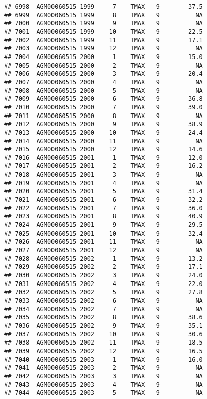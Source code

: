 \documentclass{article}\usepackage[]{graphicx}\usepackage[]{color}
\makeatletter
\newenvironment{kframe}{%
 \def\at@end@of@kframe{}%
 \ifinner\ifhmode%
  \def\at@end@of@kframe{\end{minipage}}%
  \begin{minipage}{\columnwidth}%
 \fi\fi%
 \def\FrameCommand##1{\hskip\@totalleftmargin \hskip-\fboxsep
 \colorbox{shadecolor}{##1}\hskip-\fboxsep
     \hskip-\linewidth \hskip-\@totalleftmargin \hskip\columnwidth}%
 \MakeFramed {\advance\hsize-\width
   \@totalleftmargin\z@ \linewidth\hsize
   \@setminipage}}%
 {\par\unskip\endMakeFramed%
 \at@end@of@kframe}
\newenvironment{knitrout}{}{} %
\makeatother
\begin{document}
\begin{knitrout}
\begin{kframe}
\begin{verbatim}
## 6998  AGM00060515 1999     7    TMAX   9        37.5
## 6999  AGM00060515 1999     8    TMAX   9          NA
## 7000  AGM00060515 1999     9    TMAX   9          NA
## 7001  AGM00060515 1999    10    TMAX   9        22.5
## 7002  AGM00060515 1999    11    TMAX   9        17.1
## 7003  AGM00060515 1999    12    TMAX   9          NA
## 7004  AGM00060515 2000     1    TMAX   9        15.0
## 7005  AGM00060515 2000     2    TMAX   9          NA
## 7006  AGM00060515 2000     3    TMAX   9        20.4
## 7007  AGM00060515 2000     4    TMAX   9          NA
## 7008  AGM00060515 2000     5    TMAX   9          NA
## 7009  AGM00060515 2000     6    TMAX   9        36.8
## 7010  AGM00060515 2000     7    TMAX   9        39.0
## 7011  AGM00060515 2000     8    TMAX   9          NA
## 7012  AGM00060515 2000     9    TMAX   9        38.9
## 7013  AGM00060515 2000    10    TMAX   9        24.4
## 7014  AGM00060515 2000    11    TMAX   9          NA
## 7015  AGM00060515 2000    12    TMAX   9        14.6
## 7016  AGM00060515 2001     1    TMAX   9        12.0
## 7017  AGM00060515 2001     2    TMAX   9        16.2
## 7018  AGM00060515 2001     3    TMAX   9          NA
## 7019  AGM00060515 2001     4    TMAX   9          NA
## 7020  AGM00060515 2001     5    TMAX   9        31.4
## 7021  AGM00060515 2001     6    TMAX   9        32.2
## 7022  AGM00060515 2001     7    TMAX   9        36.0
## 7023  AGM00060515 2001     8    TMAX   9        40.9
## 7024  AGM00060515 2001     9    TMAX   9        29.5
## 7025  AGM00060515 2001    10    TMAX   9        32.4
## 7026  AGM00060515 2001    11    TMAX   9          NA
## 7027  AGM00060515 2001    12    TMAX   9          NA
## 7028  AGM00060515 2002     1    TMAX   9        13.2
## 7029  AGM00060515 2002     2    TMAX   9        17.1
## 7030  AGM00060515 2002     3    TMAX   9        24.0
## 7031  AGM00060515 2002     4    TMAX   9        22.0
## 7032  AGM00060515 2002     5    TMAX   9        27.8
## 7033  AGM00060515 2002     6    TMAX   9          NA
## 7034  AGM00060515 2002     7    TMAX   9          NA
## 7035  AGM00060515 2002     8    TMAX   9        38.6
## 7036  AGM00060515 2002     9    TMAX   9        35.1
## 7037  AGM00060515 2002    10    TMAX   9        30.6
## 7038  AGM00060515 2002    11    TMAX   9        18.5
## 7039  AGM00060515 2002    12    TMAX   9        16.5
## 7040  AGM00060515 2003     1    TMAX   9        16.0
## 7041  AGM00060515 2003     2    TMAX   9          NA
## 7042  AGM00060515 2003     3    TMAX   9          NA
## 7043  AGM00060515 2003     4    TMAX   9          NA
## 7044  AGM00060515 2003     5    TMAX   9          NA

\end{verbatim}
\end{kframe}
\end{knitrout}
\end{document}
